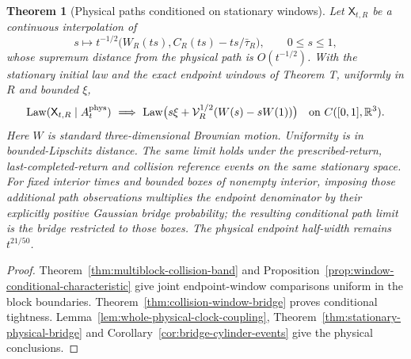 \documentclass[11pt,reqno]{amsart}
\numberwithin{equation}{section}
\newtheorem{maintheorem}{Theorem}
\theoremstyle{definition}\newtheorem{definition}[theorem]{Definition}
\theoremstyle{remark}\newtheorem{remark}[theorem]{Remark}
\newcommand{\R}{\mathbb R}\newcommand{\Z}{\mathbb Z}\newcommand{\T}{\mathbb T}
\begin{document}
\begin{maintheorem}[Physical paths conditioned on stationary windows]
\label{thm:intro-stationary-window-bridge}
Let $\mathsf X_{t,R}$ be a continuous interpolation of
\[
 s\longmapsto t^{-1/2}
   \bigl(W_R(ts),C_R(ts)-ts/\bar\tau_R\bigr),\qquad 0\le s\le1,
\]
whose supremum distance from the physical path is $O(t^{-1/2})$.
With the stationary initial law and the exact endpoint windows of
Theorem T, uniformly in $R$ and bounded $\xi$,
\[
 \operatorname{Law}(\mathsf X_{t,R}\mid A_t^{\rm phys})
       \ \Longrightarrow\
 \operatorname{Law}\bigl(s\xi+
     \mathcal V_R^{1/2}(W(s)-sW(1))\bigr)
       \quad\hbox{on }C([0,1],\R^3).
\]
Here $W$ is standard three-dimensional Brownian motion. Uniformity
is in bounded-Lipschitz distance. The same limit holds under the
prescribed-return, last-completed-return and collision reference events
on the same stationary space. For fixed interior times and bounded
boxes of nonempty interior, imposing those additional path observations
multiplies the endpoint denominator by their explicitly positive
Gaussian bridge probability; the resulting conditional path limit is
the bridge restricted to those boxes. The physical endpoint half-width
remains $t^{21/50}$.
\end{maintheorem}
\begin{proof}
Theorem~\ref{thm:multiblock-collision-band} and
Proposition~\ref{prop:window-conditional-characteristic} give joint
endpoint-window comparisons uniform in the block boundaries.
Theorem~\ref{thm:collision-window-bridge} proves conditional tightness.
Lemma~\ref{lem:whole-physical-clock-coupling},
Theorem~\ref{thm:stationary-physical-bridge} and
Corollary~\ref{cor:bridge-cylinder-events} give the physical conclusions.
\end{proof}
\end{document}
